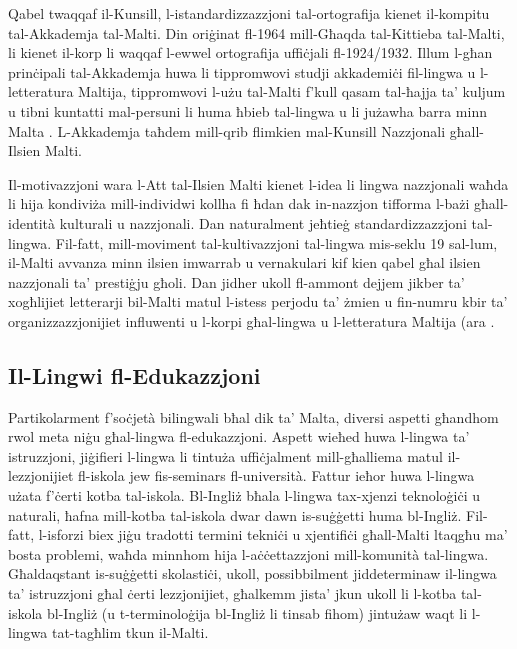\begin{multicols}{2}
Qabel twaqqaf il-Kunsill, l-istandardizzazzjoni tal-ortografija kienet il-kompitu tal-Akkademja tal-Malti. Din oriġinat fl-1964 mill-Għaqda tal-Kittieba tal-Malti, li kienet il-korp li waqqaf l-ewwel ortografija uffiċjali fl-1924/1932. Illum l-għan prinċipali tal-Akkademja huwa li tippromwovi studji akkademiċi fil-lingwa u l-letteratura Maltija, tippromwovi l-użu tal-Malti f’kull qasam tal-ħajja ta’ kuljum u tibni kuntatti mal-persuni li huma ħbieb tal-lingwa u li jużawha barra minn Malta \cite{Akkademja1}. L-Akkademja taħdem mill-qrib flimkien mal-Kunsill Nazzjonali għall-Ilsien Malti.

Il-motivazzjoni wara l-Att tal-Ilsien Malti kienet l-idea li lingwa nazzjonali waħda li hija kondiviża mill-individwi kollha fi ħdan dak in-nazzjon tifforma l-bażi għall-identità kulturali u nazzjonali. Dan naturalment jeħtieġ standardizzazzjoni tal-lingwa. Fil-fatt, mill-moviment tal-kultivazzjoni tal-lingwa mis-seklu 19 sal-lum, il-Malti avvanza minn ilsien imwarrab u vernakulari kif kien qabel għal ilsien nazzjonali ta’ prestiġju għoli. Dan jidher ukoll fl-ammont dejjem jikber ta’ xogħlijiet letterarji bil-Malti matul l-istess perjodu ta’ żmien u fin-numru kbir ta’ organizzazzjonijiet influwenti u l-korpi għal-lingwa u l-letteratura Maltija (ara \cite{Fabri:2011a}.

\subsection{Il-Lingwi fl-Edukazzjoni}

Partikolarment f'soċjetà bilingwali bħal dik ta’ Malta, diversi aspetti għandhom rwol meta niġu għal-lingwa fl-edukazzjoni.
Aspett wieħed huwa l-lingwa ta’ istruzzjoni, jiġifieri l-lingwa li tintuża uffiċjalment mill-għalliema matul il-lezzjonijiet fl-iskola jew fis-seminars fl-università.
Fattur ieħor huwa l-lingwa użata f'ċerti kotba tal-iskola. Bl-Ingliż bħala l-lingwa tax-xjenzi teknoloġiċi u naturali, ħafna mill-kotba tal-iskola dwar dawn is-suġġetti huma bl-Ingliż. Fil-fatt, l-isforzi biex jiġu tradotti termini tekniċi u xjentifiċi għall-Malti ltaqgħu ma’  bosta problemi, waħda minnhom hija l-aċċettazzjoni mill-komunità tal-lingwa. Għaldaqstant is-suġġetti skolastiċi, ukoll, possibbilment jiddeterminaw il-lingwa ta’ istruzzjoni għal ċerti lezzjonijiet, għalkemm jista’ jkun ukoll li l-kotba tal-iskola bl-Ingliż (u t-terminoloġija bl-Ingliż li tinsab fihom) jintużaw waqt li l-lingwa tat-tagħlim tkun il-Malti.


\end{multicols}
